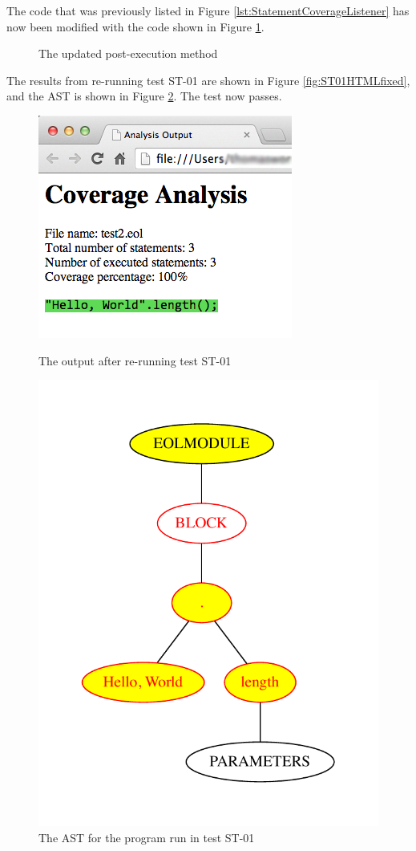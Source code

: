 The code that was previously listed in Figure \ref{lst:StatementCoverageListener} has now been modified with the code shown in Figure \ref{lst:StatementCoverageST01Mod}.

\begin{figure}[h]
	
	\caption{The updated post-execution method}
	\label{lst:StatementCoverageST01Mod}
\end{figure}

The results from re-running test ST-01 are shown in Figure \ref{fig:ST01HTMLfixed}, and the AST is shown in Figure \ref{fig:ST01ASTfixed}. The test now passes.

\begin{figure}
\centering
\begin{minipage}{.5\textwidth}
  \centering
  \includegraphics[width=0.6\linewidth]{figures/ST01HTML_fixed.png}
  \caption{The output after re-running test ST-01}
  \label{fig:ST01HTMLfixed}
\end{minipage}%
\begin{minipage}{.5\textwidth}
  \centering
  \includegraphics[width=0.6\linewidth]{figures/ST01AST_fixed.pdf}
  \caption{The AST for the program run in test ST-01}
  \label{fig:ST01ASTfixed}
\end{minipage}
\end{figure}

